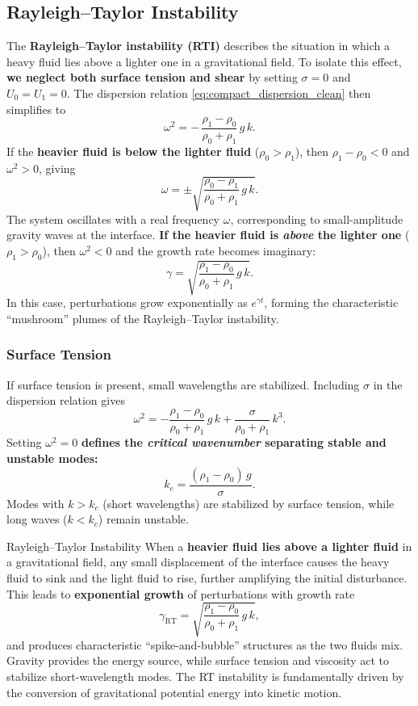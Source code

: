 \subsection{Rayleigh--Taylor Instability}
\label{sec:rayleigh_taylor}

The \textbf{Rayleigh--Taylor instability (RTI)} describes the situation in which a heavy fluid lies above a lighter one in a gravitational field. To isolate this effect, \textbf{we neglect both surface tension and shear} by setting $\sigma = 0$ and $U_0 = U_1 = 0$. The dispersion relation \eqref{eq:compact_dispersion_clean} then simplifies to
\begin{equation}
\omega^2 = -\,\frac{\rho_1 - \rho_0}{\rho_0 + \rho_1}\,g\,k.
\end{equation}
If the \textbf{heavier fluid is below the lighter fluid} ($\rho_0 > \rho_1$), then $\rho_1 - \rho_0 < 0$ and $\omega^2 > 0$, giving 
\[
\omega = \pm \sqrt{\frac{\rho_0 - \rho_1}{\rho_0 + \rho_1}\,g\,k}.
\]
The system oscillates with a real frequency $\omega$, corresponding to small-amplitude gravity waves at the interface. \textbf{If the heavier fluid is \emph{above} the lighter one} ($\rho_1 > \rho_0$), then $\omega^2 < 0$ and the growth rate becomes imaginary:
\begin{equation}
\label{eq:rt_growth_rate}
\gamma = \sqrt{\frac{\rho_1 - \rho_0}{\rho_0 + \rho_1}\,g\,k}.
\end{equation}
In this case, perturbations grow exponentially as $e^{\gamma t}$, forming the characteristic ``mushroom'' plumes of the Rayleigh--Taylor instability.

\subsubsection{Surface Tension}
If surface tension is present, small wavelengths are stabilized. Including $\sigma$ in the dispersion relation gives
\[
\omega^2 = -\frac{\rho_1 - \rho_0}{\rho_0 + \rho_1}\,g\,k + \frac{\sigma}{\rho_0 + \rho_1}\,k^3.
\]
Setting $\omega^2 = 0$ \textbf{defines the \emph{critical wavenumber} separating stable and unstable modes:}
\begin{equation}
\label{eq:rt_critical_wavenumber}
\boxed{
k_c = \frac{(\rho_1 - \rho_0)\,g}{\sigma}.}
\end{equation}
Modes with $k > k_c$ (short wavelengths) are stabilized by surface tension, while long waves ($k < k_c$) remain unstable.
\begin{bigidea}{Rayleigh--Taylor Instability}
When a \textbf{heavier fluid lies above a lighter fluid} in a gravitational field, any small displacement of the interface causes the heavy fluid to sink and the light fluid to rise, further amplifying the initial disturbance. 
This leads to \textbf{exponential growth} of perturbations with growth rate
\[
\gamma_{\mathrm{RT}} = \sqrt{\frac{\rho_1 - \rho_0}{\rho_0 + \rho_1}\,g\,k},
\]
and produces characteristic ``spike-and-bubble'' structures as the two fluids mix.  
Gravity provides the energy source, while surface tension and viscosity act to stabilize short-wavelength modes. 
The RT instability is fundamentally driven by the conversion of gravitational potential energy into kinetic motion.
\end{bigidea}

